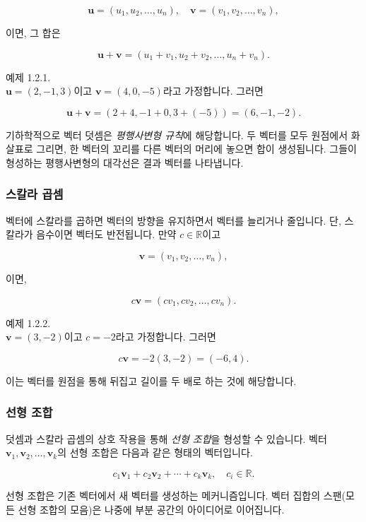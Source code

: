 \documentclass[
  12pt,
  a4paper,
]{article}
\begin{document}
\[\mathbf{u} = (u_1, u_2, \dots, u_n), \quad 
\mathbf{v} = (v_1, v_2, \dots, v_n),\]

이면, 그 합은

\[\mathbf{u} + \mathbf{v} = (u_1+v_1, u_2+v_2, \dots, u_n+v_n).\]

예제 1.2.1.\\
\(\mathbf{u} = (2, -1, 3)\)이고 \(\mathbf{v} = (4, 0, -5)\)라고 가정합니다. 그러면

\[\mathbf{u} + \mathbf{v} = (2+4, -1+0, 3+(-5)) = (6, -1, -2).\]

기하학적으로 벡터 덧셈은 \emph{평행사변형
규칙}에 해당합니다. 두 벡터를 모두 원점에서 화살표로 그리면, 한 벡터의 꼬리를 다른 벡터의 머리에 놓으면 합이 생성됩니다. 그들이 형성하는 평행사변형의 대각선은 결과 벡터를 나타냅니다.

\subsubsection{스칼라 곱셈}\label{scalar-multiplication}

벡터에 스칼라를 곱하면 벡터의 방향을 유지하면서 벡터를 늘리거나 줄입니다. 단, 스칼라가 음수이면 벡터도 반전됩니다. 만약 \(c \in \mathbb{R}\)이고

\[\mathbf{v} = (v_1, v_2, \dots, v_n),\]

이면,

\[c \mathbf{v} = (c v_1, c v_2, \dots, c v_n).\]

예제 1.2.2.\\
\(\mathbf{v} = (3, -2)\)이고 \(c = -2\)라고 가정합니다. 그러면

\[c\mathbf{v} = -2(3, -2) = (-6, 4).\]

이는 벡터를 원점을 통해 뒤집고 길이를 두 배로 하는 것에 해당합니다.

\subsubsection{선형 조합}\label{linear-combinations}

덧셈과 스칼라 곱셈의 상호 작용을 통해 \emph{선형 조합}을 형성할 수 있습니다. 벡터
\(\mathbf{v}_1, \mathbf{v}_2, \dots, \mathbf{v}_k\)의 선형 조합은 다음과 같은 형태의 벡터입니다.

\[c_1 \mathbf{v}_1 + c_2 \mathbf{v}_2 + \cdots + c_k \mathbf{v}_k, \quad c_i \in \mathbb{R}.\]

선형 조합은 기존 벡터에서 새 벡터를 생성하는 메커니즘입니다. 벡터 집합의 스팬(모든
선형 조합의 모음)은 나중에 부분 공간의 아이디어로 이어집니다.
\end{document}
